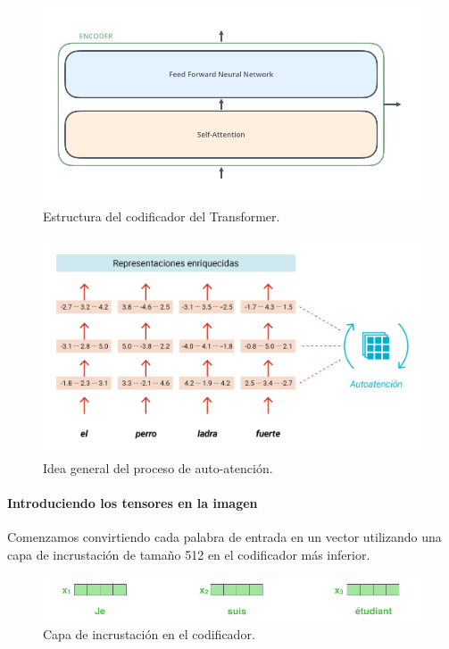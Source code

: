 \begin{figure}[h]
\centering
\includegraphics[scale=0.35]{pics/Transformer_encoder.png}
\caption{Estructura del codificador del Transformer.}
\end{figure}


\begin{figure}[h]
\centering
\includegraphics[scale=0.6]{pics/selfattention.png}
\caption{Idea general del proceso de auto-atención.}
\end{figure}

\paragraph{Introduciendo los tensores en la imagen}
Comenzamos convirtiendo cada palabra de entrada en un vector utilizando una capa de incrustación de tamaño 512 en el codificador más inferior.
\begin{figure}[h]
\centering
\includegraphics[scale=0.35]{pics/embeddings_enc.png}
\caption{Capa de incrustación en el codificador.}
\end{figure}

